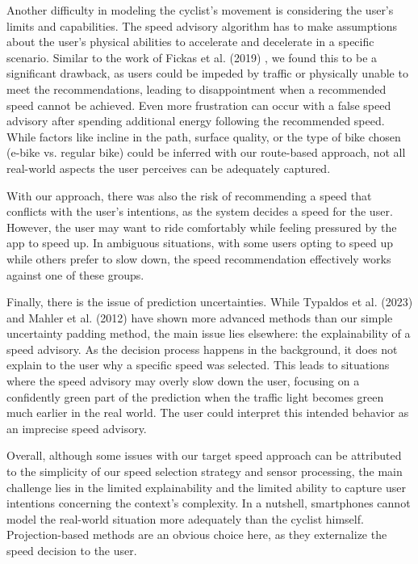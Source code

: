 Another difficulty in modeling the cyclist's movement is considering the user's limits and capabilities. The speed advisory algorithm has to make assumptions about the user's physical abilities to accelerate and decelerate in a specific scenario. Similar to the work of Fickas et al. (2019) \cite{fickas_fast_2019}, we found this to be a significant drawback, as users could be impeded by traffic or physically unable to meet the recommendations, leading to disappointment when a recommended speed cannot be achieved. Even more frustration can occur with a false speed advisory after spending additional energy following the recommended speed. While factors like incline in the path, surface quality, or the type of bike chosen (e-bike vs. regular bike) could be inferred with our route-based approach, not all real-world aspects the user perceives can be adequately captured.

With our approach, there was also the risk of recommending a speed that conflicts with the user's intentions, as the system decides a speed for the user. However, the user may want to ride comfortably while feeling pressured by the app to speed up. In ambiguous situations, with some users opting to speed up while others prefer to slow down, the speed recommendation effectively works against one of these groups. 

Finally, there is the issue of prediction uncertainties. While Typaldos et al. (2023) \cite{typaldos_modified_2023} and Mahler et al. (2012) \cite{mahler_reducing_2012} have shown more advanced methods than our simple uncertainty padding method, the main issue lies elsewhere: the explainability of a speed advisory. As the decision process happens in the background, it does not explain to the user why a specific speed was selected. This leads to situations where the speed advisory may overly slow down the user, focusing on a confidently green part of the prediction when the traffic light becomes green much earlier in the real world. The user could interpret this intended behavior as an imprecise speed advisory.

Overall, although some issues with our target speed approach can be attributed to the simplicity of our speed selection strategy and sensor processing, the main challenge lies in the limited explainability and the limited ability to capture user intentions concerning the context's complexity. In a nutshell, smartphones cannot model the real-world situation more adequately than the cyclist himself. Projection-based methods are an obvious choice here, as they externalize the speed decision to the user.

